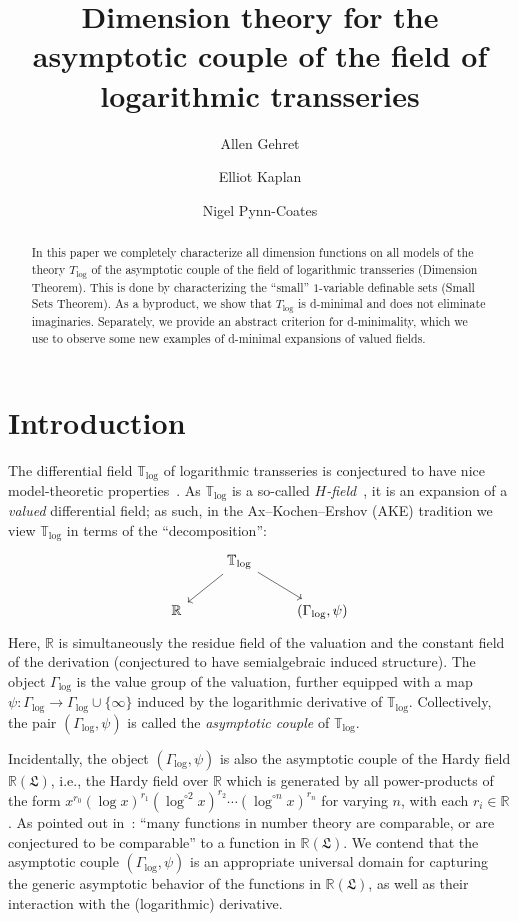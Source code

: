 \documentclass[11pt]{amsart}
\author{Allen Gehret}
\author{Elliot Kaplan}
\author{Nigel Pynn-Coates}
\title{Dimension theory for the asymptotic couple of the field of logarithmic transseries}
\theoremstyle{plain}
\theoremstyle{definition}
\numberwithin{equation}{section}
\newcommand{\fr}{\mathfrak}
\newcommand\R{\mathbb{R}}
\newcommand\0{\varnothing}
\begin{document}
\begin{abstract}
In this paper we completely characterize all dimension functions on all models of the theory $T_{\log}$ of the asymptotic couple of the field of logarithmic transseries (Dimension Theorem). This is done by characterizing the ``small'' $1$-variable definable sets (Small Sets Theorem). As a byproduct, we show that $T_{\log}$ is d-minimal and does not eliminate imaginaries. Separately, we provide an abstract criterion for d-minimality, which we use to observe some new examples of d-minimal expansions of valued fields.
\end{abstract}
\maketitle


\section{Introduction}\label{section_introduction}

\noindent
The differential field $\mathbb{T}_{\log}$ of logarithmic transseries is conjectured to have nice model-theoretic properties~\cite{gehret2017towards}. As $\mathbb{T}_{\log}$ is a so-called \emph{$H$-field}~\cite{ADAMTT}, it is an expansion of a \emph{valued} differential field; as such, in the Ax--Kochen--Ershov (AKE) tradition we view $\mathbb{T}_{\log}$ in terms of the ``decomposition'': 
\[
\begin{tikzcd}
&\arrow[ld]\mathbb{T}_{\log} \arrow[rd]  &\\
\R&& (\Gamma_{\log},\psi)
\end{tikzcd}
\]
Here, $\R$ is simultaneously the residue field of the valuation and the constant field of the derivation (conjectured to have semialgebraic induced structure). The object $\Gamma_{\log}$ is the value group of the valuation, further equipped with a map $\psi\colon\Gamma_{\log}\to\Gamma_{\log}\cup\{\infty\}$ induced by the logarithmic derivative of $\mathbb{T}_{\log}$.
Collectively, the pair $(\Gamma_{\log},\psi)$ is called the \emph{asymptotic couple} of $\mathbb{T}_{\log}$.

\medskip\noindent
Incidentally, the object $(\Gamma_{\log},\psi)$ is also the asymptotic couple of the Hardy field $\R(\fr{L})$, i.e., the Hardy field over $\R$ which is generated by all power-products of the form $x^{r_0}(\log x)^{r_1}(\log^{\circ 2}x)^{r_2}\cdots(\log^{\circ n}x)^{r_n}$ for varying $n$, with each $r_i\in\R$.
As pointed out in~\cite{elliott2024analytic_book}: ``many functions in number theory are comparable, or are conjectured to be comparable'' to a function in $\R(\fr{L})$. We contend that the asymptotic couple $(\Gamma_{\log},\psi)$ is an appropriate universal domain for capturing the generic asymptotic behavior of the functions in $\R(\fr{L})$, as well as their interaction with the (logarithmic) derivative.
\end{document}
